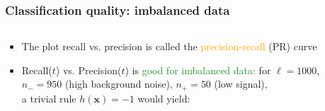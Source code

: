 \documentclass[usenames,dvipsnames,aspectratio=169]{beamer}
\begin{document}
\begin{frame}[t]
\frametitle{Classification quality: imbalanced data}

\begin{columns}
\begin{column}{0.5\textwidth}
    \begin{itemize}

        \item The plot recall vs. precision is called the
        \textcolor{orange}{precision-recall} (PR) curve

        \pause
        \item Recall($t$) vs. Precision($t$)
        is \textcolor{ForestGreen}{good for imbalanced data:}
        for $\ell = 1000$,\\
        $n_{-} = 950$ (high background noise),
        $n_{+} = 50$ (low signal),\\
        a trivial rule $h(\mathbf{x}) = -1$
        would yield:
        

\end{itemize}
\end{column}
\end{columns}
\end{frame}
\end{document}
